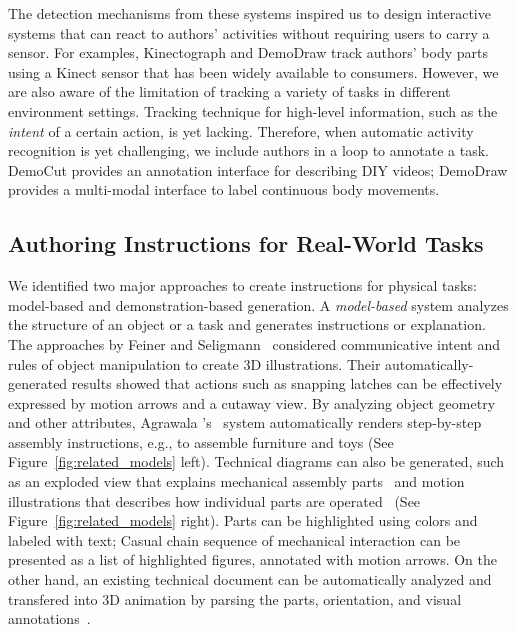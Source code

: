 The detection mechanisms from these systems inspired us to design interactive systems that can react to authors' activities without requiring users to carry  a sensor. For examples, Kinectograph and DemoDraw track authors' body parts using a Kinect sensor that has been widely available to consumers. However, we are also aware of the limitation of tracking a variety of tasks in different environment settings. Tracking technique for high-level information, such as the \emph{intent} of a certain action, is yet lacking. Therefore, when automatic activity recognition is yet challenging, we include authors in a loop to annotate a task. DemoCut provides an annotation interface for describing DIY videos; DemoDraw provides a multi-modal interface to label continuous body movements.



\subsection{Authoring Instructions for Real-World Tasks}

We identified two major approaches to create instructions for physical tasks: model-based and demonstration-based generation.
%
A \emph{model-based} system analyzes the structure of an object or a task and generates instructions or explanation.
%
The approaches by Feiner and Seligmann~\cite{feiner:1985:AEA:1299975.1300548,Seligmann:1991:AGI:127719.122732} considered communicative intent and rules of object manipulation to create 3D illustrations. Their automatically-generated results showed that actions such as snapping latches can be effectively expressed by motion arrows and a cutaway view.
%
By analyzing object geometry and other attributes, Agrawala \ea{}'s~\cite{agrawala2003designing} system automatically renders step-by-step assembly instructions, e.g., to assemble furniture and toys (See Figure~\ref{fig:related_models} left).
%
Technical diagrams can also be generated, such as an exploded view that explains mechanical assembly parts~\cite{li2008automated} and motion illustrations that describes how individual parts are operated~\cite{mitra2010illustrating} (See Figure~\ref{fig:related_models} right). Parts can be highlighted using colors and labeled with text; Casual chain sequence of mechanical interaction can be presented as a list of highlighted figures, annotated with motion arrows.
%
On the other hand, an existing technical document can be automatically analyzed and transfered into 3D animation by parsing the parts, orientation, and visual annotations~\cite{Mohr:2015:RTD:2702123.2702490}.

